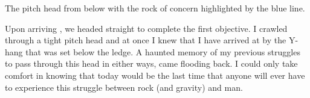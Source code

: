 \begin{marginfigure}
\checkoddpage \ifoddpage \forcerectofloat \else \forceversofloat \fi
\centering
 \caption{The \protect{} pitch head from below with the rock of concern highlighted by the blue line. }
 \label{kill'em all crack}
\end{marginfigure}

Upon arriving , we headed straight to complete the
first objective. I crawled through a tight pitch head and at once I knew
that I have arrived at  by the Y-hang that was set
below the ledge. A haunted memory of my previous struggles to pass
through this head in either ways, came flooding back. I could only take
comfort in knowing that today would be the last time that anyone will
ever have to experience this struggle between rock (and gravity) and man.

